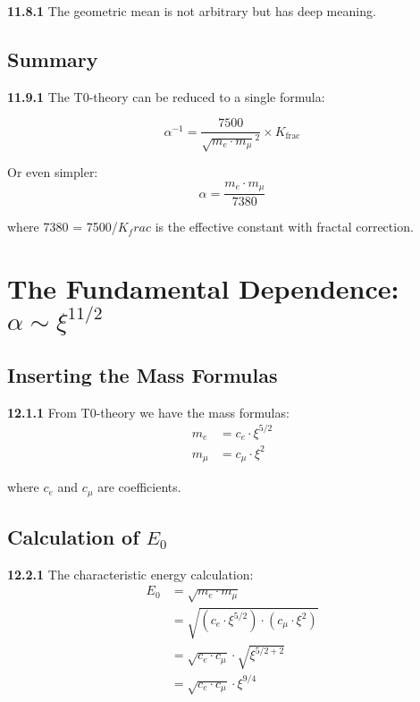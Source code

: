 \documentclass[12pt,a4paper]{article}
\newcommand{\kfrac}{K_frac}
\begin{document}
\noindent \textbf{11.8.1} The geometric mean is not arbitrary but has deep meaning.

\subsection{Summary}

\begin{tcolorbox}[colback=blue!5!white,colframe=blue!75!black,title=\textbf{The Essence}]
	\noindent \textbf{11.9.1} The T0-theory can be reduced to a single formula:
	
	\begin{equation}
		\boxed{\alpha^{-1} = \frac{7500}{\sqrt{m_e \cdot m_\mu}^2} \times K_{\text{frac}}}
	\end{equation}
	
	Or even simpler:
	\begin{equation}
		\boxed{\alpha = \frac{m_e \cdot m_\mu}{7380}}
	\end{equation}
	
	where 7380 = 7500/$\kfrac$ is the effective constant with fractal correction.
\end{tcolorbox}
\section{The Fundamental Dependence: $\alpha \sim \xi^{11/2}$}

\subsection{Inserting the Mass Formulas}

\noindent \textbf{12.1.1} From T0-theory we have the mass formulas:
\begin{align}
	m_e &= c_e \cdot \xi^{5/2} \\
	m_\mu &= c_\mu \cdot \xi^2
\end{align}

where $c_e$ and $c_\mu$ are coefficients.

\subsection{Calculation of $E_0$}

\noindent \textbf{12.2.1} The characteristic energy calculation:
\begin{align}
	E_0 &= \sqrt{m_e \cdot m_\mu} \\
	&= \sqrt{(c_e \cdot \xi^{5/2}) \cdot (c_\mu \cdot \xi^2)} \\
	&= \sqrt{c_e \cdot c_\mu} \cdot \sqrt{\xi^{5/2 + 2}} \\
	&= \sqrt{c_e \cdot c_\mu} \cdot \xi^{9/4}
\end{align}
\end{document}
